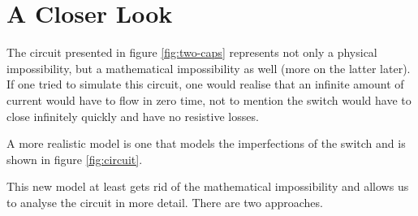 \section{A Closer Look}

The circuit presented in  figure  \ref{fig:two-caps}  represents  not  only  a
physical  impossibility, but a mathematical impossibility as well (more on the
latter later). If one  tried  to simulate this circuit, one would realise that
an infinite amount of current would have to flow in zero  time, not to mention
the switch would have  to  close  infinitely  quickly  and  have  no resistive
losses.

A more  realistic  model is one that models the imperfections
of the switch and is shown in figure \ref{fig:circuit}.

This new model at least gets rid  of the mathematical impossibility and allows
us  to  analyse  the  circuit  in  more  detail.  There  are  two  approaches.


\clearpage
